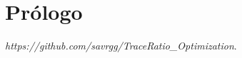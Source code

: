 \chapter*{Prólogo}	
\label{ch:prologo} 



\textit{https://github.com/savrgg/TraceRatio\_Optimization}.

